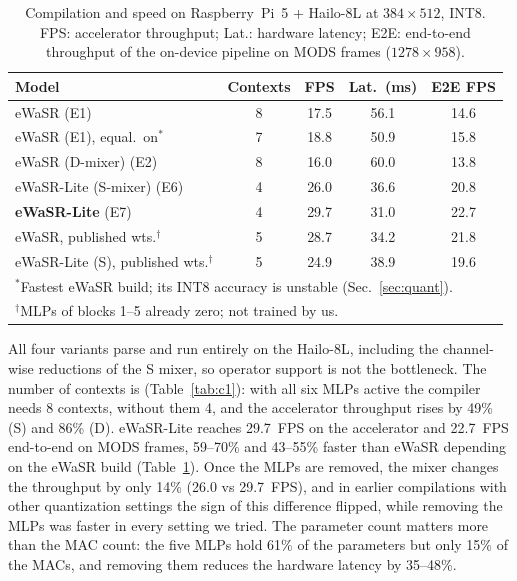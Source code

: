 \documentclass[conference]{IEEEtran}
\begin{document}
\begin{table}[t]
\centering
\caption{Compilation and speed on Raspberry~Pi~5 + Hailo-8L at $384\times512$, INT8. FPS: accelerator throughput; Lat.: hardware latency; E2E: end-to-end throughput of the on-device pipeline on MODS frames ($1278\times958$).}
\label{tab:hw}
\setlength{\tabcolsep}{3pt}
\begin{tabular}{lcccc}
\toprule
Model & Contexts & FPS & Lat.\ (ms) & E2E FPS \\
\midrule
eWaSR (E1)                    & 8 & 17.5 & 56.1 & 14.6 \\
eWaSR (E1), equal.\ on$^\ast$ & 7 & 18.8 & 50.9 & 15.8 \\
eWaSR (D-mixer) (E2)          & 8 & 16.0 & 60.0 & 13.8 \\
eWaSR-Lite (S-mixer) (E6)     & 4 & 26.0 & 36.6 & 20.8 \\
\textbf{eWaSR-Lite} (E7)      & 4 & 29.7 & 31.0 & 22.7 \\
\midrule
eWaSR, published wts.$^\dagger$            & 5 & 28.7 & 34.2 & 21.8 \\
eWaSR-Lite (S), published wts.$^\dagger$   & 5 & 24.9 & 38.9 & 19.6 \\
\bottomrule
\multicolumn{5}{l}{\footnotesize $^\ast$Fastest eWaSR build; its INT8 accuracy is unstable (Sec.~\ref{sec:quant}).}\\
\multicolumn{5}{l}{\footnotesize $^\dagger$MLPs of blocks 1--5 already zero; not trained by us.}
\end{tabular}
\end{table}

All four variants parse and run entirely on the Hailo-8L, including the channel-wise reductions of the S mixer, so operator support is not the bottleneck. The number of contexts is (Table~\ref{tab:c1}): with all six MLPs active the compiler needs 8 contexts, without them 4, and the accelerator throughput rises by 49\% (S) and 86\% (D). eWaSR-Lite reaches 29.7~FPS on the accelerator and 22.7~FPS end-to-end on MODS frames, 59--70\% and 43--55\% faster than eWaSR depending on the eWaSR build (Table~\ref{tab:hw}). Once the MLPs are removed, the mixer changes the throughput by only 14\% (26.0 vs 29.7~FPS), and in earlier compilations with other quantization settings the sign of this difference flipped, while removing the MLPs was faster in every setting we tried. The parameter count matters more than the MAC count: the five MLPs hold 61\% of the parameters but only 15\% of the MACs, and removing them reduces the hardware latency by 35--48\%.
\end{document}
